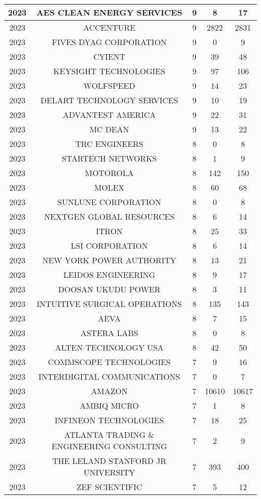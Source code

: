 \documentclass{article}%
\begin{document}
\begin{longtable}{c|c|c|c|c}
\hline%
2023&AES CLEAN ENERGY SERVICES&9&8&17\\%
\hline%
2023&ACCENTURE&9&2822&2831\\%
\hline%
2023&FIVES DYAG CORPORATION&9&0&9\\%
\hline%
2023&CYIENT&9&39&48\\%
\hline%
2023&KEYSIGHT TECHNOLOGIES&9&97&106\\%
\hline%
2023&WOLFSPEED&9&14&23\\%
\hline%
2023&DELART TECHNOLOGY SERVICES&9&10&19\\%
\hline%
2023&ADVANTEST AMERICA&9&22&31\\%
\hline%
2023&MC DEAN&9&13&22\\%
\hline%
2023&TRC ENGINEERS&8&0&8\\%
\hline%
2023&STARTECH NETWORKS&8&1&9\\%
\hline%
2023&MOTOROLA&8&142&150\\%
\hline%
2023&MOLEX&8&60&68\\%
\hline%
2023&SUNLUNE CORPORATION&8&0&8\\%
\hline%
2023&NEXTGEN GLOBAL RESOURCES&8&6&14\\%
\hline%
2023&ITRON&8&25&33\\%
\hline%
2023&LSI CORPORATION&8&6&14\\%
\hline%
2023&NEW YORK POWER AUTHORITY&8&13&21\\%
\hline%
2023&LEIDOS ENGINEERING&8&9&17\\%
\hline%
2023&DOOSAN UKUDU POWER&8&3&11\\%
\hline%
2023&INTUITIVE SURGICAL OPERATIONS&8&135&143\\%
\hline%
2023&AEVA&8&7&15\\%
\hline%
2023&ASTERA LABS&8&0&8\\%
\hline%
2023&ALTEN TECHNOLOGY USA&8&42&50\\%
\hline%
2023&COMMSCOPE TECHNOLOGIES&7&9&16\\%
\hline%
2023&INTERDIGITAL COMMUNICATIONS&7&0&7\\%
\hline%
2023&AMAZON&7&10610&10617\\%
\hline%
2023&AMBIQ MICRO&7&1&8\\%
\hline%
2023&INFINEON TECHNOLOGIES&7&18&25\\%
\hline%
2023&ATLANTA TRADING \& ENGINEERING CONSULTING&7&2&9\\%
\hline%
2023&THE LELAND STANFORD JR UNIVERSITY&7&393&400\\%
\hline%
2023&ZEF SCIENTIFIC&7&5&12\\%

\end{longtable}
\end{document}
